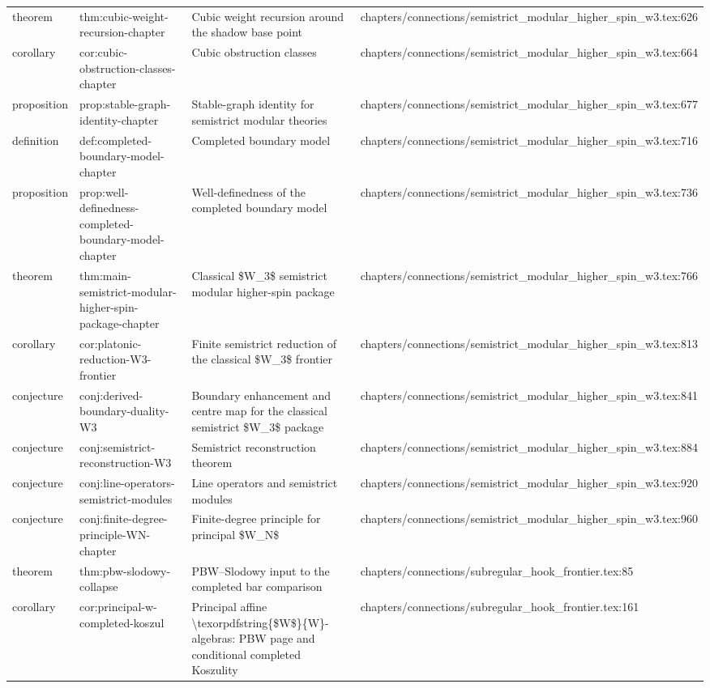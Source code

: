 \documentclass[11pt]{article}
\begin{document}
\begin{longtable}{L{0.10\textwidth}L{0.26\textwidth}L{0.42\textwidth}L{0.22\textwidth}}
theorem & thm:cubic-weight-recursion-chapter & Cubic weight recursion around the shadow base point & chapters/connections/semistrict\_modular\_higher\_spin\_w3.tex:626\\
corollary & cor:cubic-obstruction-classes-chapter & Cubic obstruction classes & chapters/connections/semistrict\_modular\_higher\_spin\_w3.tex:664\\
proposition & prop:stable-graph-identity-chapter & Stable-graph identity for semistrict modular theories & chapters/connections/semistrict\_modular\_higher\_spin\_w3.tex:677\\
definition & def:completed-boundary-model-chapter & Completed boundary model & chapters/connections/semistrict\_modular\_higher\_spin\_w3.tex:716\\
proposition & prop:well-definedness-completed-boundary-model-chapter & Well-definedness of the completed boundary model & chapters/connections/semistrict\_modular\_higher\_spin\_w3.tex:736\\
theorem & thm:main-semistrict-modular-higher-spin-package-chapter & Classical \$W\_3\$ semistrict modular higher-spin package & chapters/connections/semistrict\_modular\_higher\_spin\_w3.tex:766\\
corollary & cor:platonic-reduction-W3-frontier & Finite semistrict reduction of the classical \$W\_3\$ frontier & chapters/connections/semistrict\_modular\_higher\_spin\_w3.tex:813\\
conjecture & conj:derived-boundary-duality-W3 & Boundary enhancement and centre map for the classical semistrict \$W\_3\$ package & chapters/connections/semistrict\_modular\_higher\_spin\_w3.tex:841\\
conjecture & conj:semistrict-reconstruction-W3 & Semistrict reconstruction theorem & chapters/connections/semistrict\_modular\_higher\_spin\_w3.tex:884\\
conjecture & conj:line-operators-semistrict-modules & Line operators and semistrict modules & chapters/connections/semistrict\_modular\_higher\_spin\_w3.tex:920\\
conjecture & conj:finite-degree-principle-WN-chapter & Finite-degree principle for principal \$W\_N\$ & chapters/connections/semistrict\_modular\_higher\_spin\_w3.tex:960\\
theorem & thm:pbw-slodowy-collapse & PBW--Slodowy input to the completed bar comparison & chapters/connections/subregular\_hook\_frontier.tex:85\\
corollary & cor:principal-w-completed-koszul & Principal affine \textbackslash{}texorpdfstring\{\$W\$\}\{W\}-algebras: PBW page and cond{}itional completed Koszulity & chapters/connections/subregular\_hook\_frontier.tex:161\\

\end{longtable}
\end{document}
